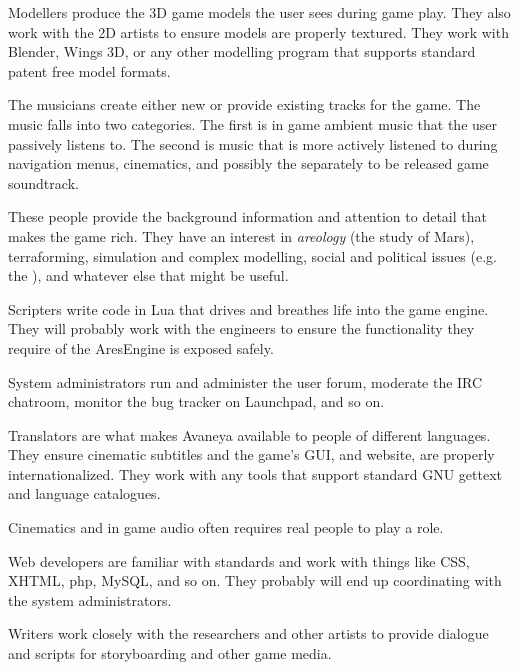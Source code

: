 Modellers produce the 3D game models the user sees during game play. They also work with the 2D artists to ensure models are properly textured. They work with Blender, Wings 3D, or any other modelling program that supports standard patent free model formats.


The musicians create either new or provide existing tracks for the game. The music falls into two categories. The first is in game ambient music that the user passively listens to. The second is music that is more actively listened to during navigation menus, cinematics, and possibly the separately to be released game soundtrack.


These people provide the background information and attention to detail that makes the game rich. They have an interest in {\it areology} (the study of Mars), terraforming, simulation and complex modelling, social and political issues (e.g. the ), and whatever else that might be useful.


Scripters write code in Lua that drives and breathes life into the game engine. They will probably work with the engineers to ensure the functionality they require of the AresEngine is exposed safely.


System administrators run and administer the user forum, moderate the IRC chatroom, monitor the bug tracker on Launchpad, and so on.


Translators are what makes Avaneya available to people of different languages. They ensure cinematic subtitles and the game's GUI, and website, are properly internationalized. They work with any tools that support standard GNU gettext and language catalogues.


Cinematics and in game audio often requires real people to play a role.


Web developers are familiar with standards and work with things like CSS, XHTML, php, MySQL, and so on. They probably will end up coordinating with the system administrators.


Writers work closely with the researchers and other artists to provide dialogue and scripts for storyboarding and other game media.
\stopitemize


